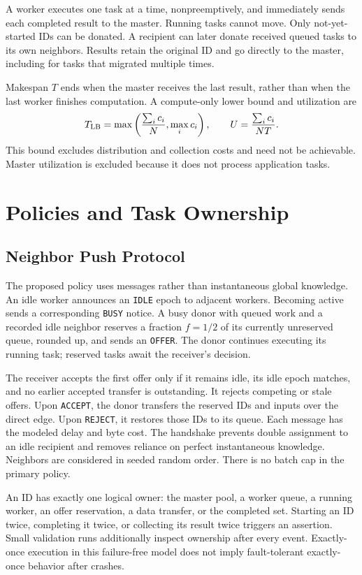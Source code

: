 \documentclass[10pt,journal,twocolumn]{IEEEtran}
\begin{document}
A worker executes one task at a time, nonpreemptively, and immediately sends each completed result to the master. Running tasks cannot move. Only not-yet-started IDs can be donated. A recipient can later donate received queued tasks to its own neighbors. Results retain the original ID and go directly to the master, including for tasks that migrated multiple times.

Makespan $T$ ends when the master receives the last result, rather than when the last worker finishes computation. A compute-only lower bound and utilization are
\begin{equation}
T_{\rm LB}=\max\left(\frac{\sum_i c_i}{N},\max_i c_i\right),\qquad
U=\frac{\sum_i c_i}{NT}.
\end{equation}
This bound excludes distribution and collection costs and need not be achievable. Master utilization is excluded because it does not process application tasks.

\section{Policies and Task Ownership}
\subsection{Neighbor Push Protocol}
The proposed policy uses messages rather than instantaneous global knowledge. An idle worker announces an \texttt{IDLE} epoch to adjacent workers. Becoming active sends a corresponding \texttt{BUSY} notice. A busy donor with queued work and a recorded idle neighbor reserves a fraction $f=1/2$ of its currently unreserved queue, rounded up, and sends an \texttt{OFFER}. The donor continues executing its running task; reserved tasks await the receiver's decision.

The receiver accepts the first offer only if it remains idle, its idle epoch matches, and no earlier accepted transfer is outstanding. It rejects competing or stale offers. Upon \texttt{ACCEPT}, the donor transfers the reserved IDs and inputs over the direct edge. Upon \texttt{REJECT}, it restores those IDs to its queue. Each message has the modeled delay and byte cost. The handshake prevents double assignment to an idle recipient and removes reliance on perfect instantaneous knowledge. Neighbors are considered in seeded random order. There is no batch cap in the primary policy.

An ID has exactly one logical owner: the master pool, a worker queue, a running worker, an offer reservation, a data transfer, or the completed set. Starting an ID twice, completing it twice, or collecting its result twice triggers an assertion. Small validation runs additionally inspect ownership after every event. Exactly-once execution in this failure-free model does not imply fault-tolerant exactly-once behavior after crashes.
\end{document}
